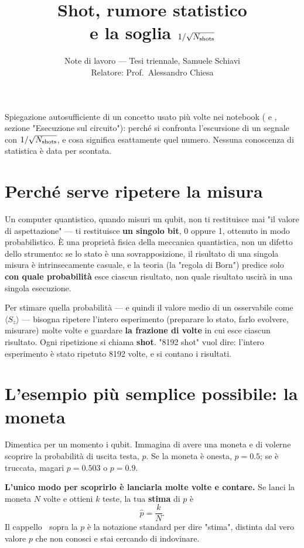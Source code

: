 \documentclass[11pt,a4paper]{article}
\title{\vspace{-1.5em}\color{inkblue}Shot, rumore statistico\\[0.1em]e la soglia $1/\sqrt{N_{\rm shots}}$}
\author{Note di lavoro --- Tesi triennale, Samuele Schiavi\\ Relatore: Prof.\ Alessandro Chiesa}
\date{}
\begin{document}
\sloppy
\maketitle
\thispagestyle{fancy}
\vspace{-2em}

Spiegazione autosufficiente di un concetto usato più volte nei notebook
(\texttt{} e
\texttt{}, sezione "Esecuzione sul
circuito"): perché si confronta l'escursione di un segnale con
$1/\sqrt{N_{\rm shots}}$, e cosa significa esattamente quel numero.
Nessuna conoscenza di statistica è data per scontata.

\section{Perché serve ripetere la misura}

Un computer quantistico, quando misuri un qubit, non ti restituisce mai
"il valore di aspettazione" --- ti restituisce \textbf{un singolo bit},
0 oppure 1, ottenuto in modo probabilistico. È una proprietà fisica
della meccanica quantistica, non un difetto dello strumento: se lo
stato è una sovrapposizione, il risultato di una singola misura è
intrinsecamente casuale, e la teoria (la "regola di Born") predice solo
\textbf{con quale probabilità} esce ciascun risultato, non quale
risultato uscirà in una singola esecuzione.

Per stimare quella probabilità --- e quindi il valore medio di un
osservabile come $\langle S_z\rangle$ --- bisogna ripetere l'intero
esperimento (preparare lo stato, farlo evolvere, misurare) molte volte
e guardare \textbf{la frazione di volte} in cui esce ciascun risultato.
Ogni ripetizione si chiama \textbf{shot}. "8192 shot" vuol dire:
l'intero esperimento è stato ripetuto 8192 volte, e si contano i
risultati.

\section{L'esempio più semplice possibile: la moneta}

Dimentica per un momento i qubit. Immagina di avere una moneta e di
volerne scoprire la probabilità di uscita testa, $p$. Se la moneta è
onesta, $p=0.5$; se è truccata, magari $p=0.503$ o $p=0.9$.

\textbf{L'unico modo per scoprirlo è lanciarla molte volte e contare.}
Se lanci la moneta $N$ volte e ottieni $k$ teste, la tua \textbf{stima}
di $p$ è
$$\hat p = \frac{k}{N}.$$
Il cappello $\hat{\ }$ sopra la $p$ è la notazione standard per dire
"stima", distinta dal vero valore $p$ che non conosci e stai cercando
di indovinare.
\end{document}
